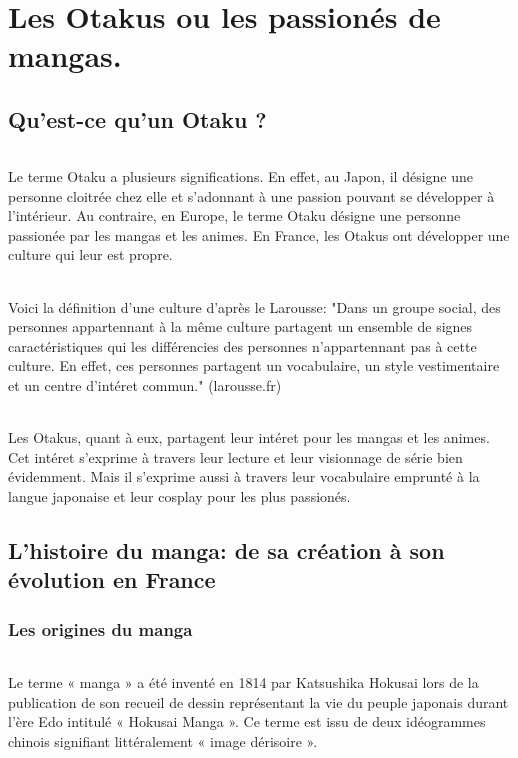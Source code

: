\part{Les Otakus ou les passionés de mangas.}
\chapter{Qu'est-ce qu'un Otaku ?}
\paragraph{}
Le terme Otaku a plusieurs significations. En effet, au Japon, il désigne une personne cloitrée chez elle et s'adonnant à une passion pouvant se développer à l'intérieur. Au contraire, en Europe, le terme Otaku désigne une personne passionée par les mangas et les animes. En France, les Otakus ont développer une culture qui leur est propre.
\paragraph{}
Voici la définition d'une culture d'après le Larousse:
"Dans un groupe social, des personnes appartennant à la même culture partagent un ensemble de signes caractéristiques qui les différencies des personnes n'appartennant pas à cette culture. En effet, ces personnes partagent un vocabulaire, un style vestimentaire et un centre d'intéret commun." (larousse.fr)
\paragraph{}
Les Otakus, quant à eux, partagent leur intéret pour les mangas et les animes. Cet intéret s'exprime à travers leur lecture et leur visionnage de série bien évidemment. Mais il s'exprime aussi à travers leur vocabulaire emprunté à la langue japonaise et leur cosplay pour les plus passionés. 

\chapter{L'histoire du manga: de sa création à son évolution en France}

\section{Les origines du manga}
\paragraph{}
Le terme « manga » a été inventé en 1814 par Katsushika Hokusai lors de la publication de son recueil de dessin représentant la vie du peuple japonais durant l’ère Edo intitulé « Hokusai Manga ». Ce terme est issu de deux idéogrammes chinois signifiant littéralement « image dérisoire ». 

